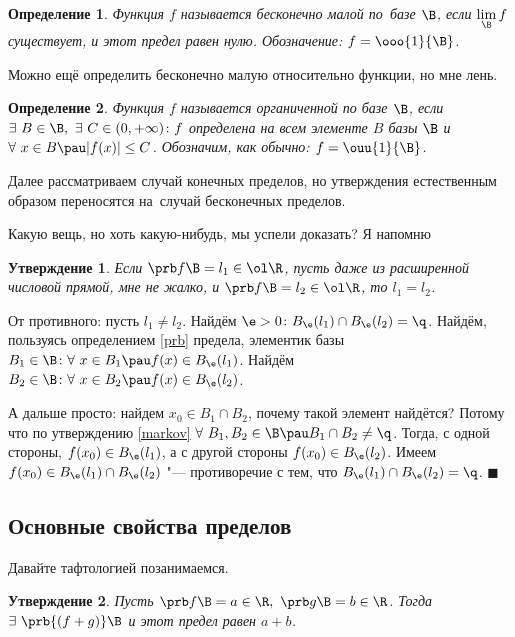 \documentclass[a4paper,10pt,twoside]{article}
\newtheorem{Def}{Определение}[section]
\newtheorem{Ut}{Утверждение}[section]
\newenvironment{Proof}
       {\par\noindent{\textbf{Доказательство.}}}
       {\hfill$\scriptstyle\blacksquare$}
\begin{document}
 \begin{Def}
 Функция $f$ называется бесконечно малой по~базе $\B$, если $\lim\limits_{\B}f$ существует, и этот предел равен нулю. 
 Обозначение: $f=\ooo{1}{\B}$.
 \end{Def}
 
 Можно ещё определить бесконечно малую относительно функции, но мне лень.
 
 \begin{Def}
 	Функция $f$ называется органиченной по базе $\B$, если 
 	$\exists\  B\in\B, \ \exists\  C \in(0, +\infty)\colon f$ определена на всем элементе $B$ базы $\B$ и $\forall\  x\in B\pau |f(x)|\leq C$.
 	Обозначим, как обычно: $f= \ouu{1}{\B}$.
 \end{Def}
 
 Далее рассматриваем случай конечных пределов, но утверждения естественным образом переносятся на~случай бесконечных пределов.
 
 Какую вещь, но хоть какую-нибудь, мы успели доказать? Я напомню
 \begin{Ut}
 	Если $\prb f{\B}=l_1 \in\ol\R$, пусть даже из расширенной числовой прямой, мне не жалко, 
 	и $\prb f{\B}=l_2 \in\ol\R$, то $l_1=l_2$. 
 \end{Ut}
 
 \begin{Proof}
 	От противного: пусть $l_1\neq l_2$. Найдём $\e>0 \colon B_\e(l_1)\cap B_\e(l_2)=\q$.
 	Найдём, пользуясь определением \ref{prb} предела, элементик базы 
 	$B_1\in \B\colon\forall\  x\in B_1 \pau f(x)\in B_\e(l_1)$.
 	Найдём ${B_2\in\B \colon\forall\ x\in B_2\pau f(x)\in B_\e(l_2)}$.
 	
 	А дальше просто: найдем $x_0 \in B_1\cap B_2$, почему такой элемент найдётся? Потому что по утверждению \ref{markov} 
 	$\forall\  B_1, B_2 \in\B \pau B_1\cap B_2 \neq\q$. Тогда, с одной стороны, $f(x_0)\in B_\e(l_1)$, а с другой стороны 
 	$f(x_0)\in B_\e(l_2)$. Имеем $f(x_0)\in B_\e(l_1)\cap B_\e(l_2)$ "---
 	противоречие с тем, что $B_\e(l_1)\cap B_\e(l_2)=\q$.
 \end{Proof}
 
 \subsection{Основные свойства пределов}
 Давайте тафтологией позанимаемся.
 
 \begin{Ut}\label{prbsum}
 Пусть $\prb f\B=a\in\R,\ \prb g\B=b\in\R$. Тогда $\exists\  \prb {(f+g)}\B$ и этот предел равен $a+b$.
 \end{Ut}
 
\end{document}
